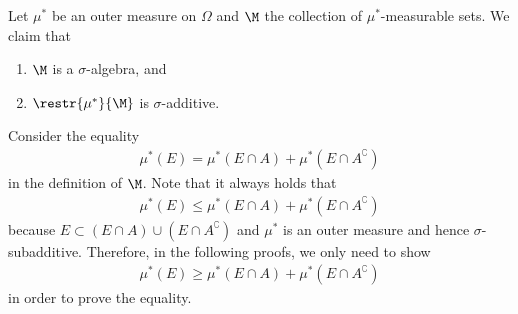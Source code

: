 \documentclass[thmcnt=section, 12pt]{elegantbook}
\begin{document}

\begin{theorem} \label{thm:4} %
    Let $ \mu^\ast $ be an outer measure on $ \Omega $ and $ \M $ the collection of $ \mu^\ast $-measurable sets. We claim that 
    \begin{enumerate}
        \item $ \M $ is a $ \sigma $-algebra, and
        \item $ \restr{\mu^\ast}{\M} $ is $ \sigma $-additive.
    \end{enumerate}
\end{theorem}

\par Consider the equality 
\begin{align*}
    \mu^\ast(E) = \mu^\ast(E \cap A) + \mu^\ast(E \cap A^\complement)
\end{align*}
in the definition of $ \M $. Note that it always holds that 
\begin{align*}
    \mu^\ast(E) \leq \mu^\ast(E \cap A) + \mu^\ast(E \cap A^\complement)
\end{align*}
because $ E \subset (E\cap A) \cup (E \cap A^\complement) $ and $ \mu^\ast $ is an outer measure and hence $ \sigma $-subadditive. Therefore, in the following proofs, we only need to show  
\begin{align*}
    \mu^\ast(E) \geq \mu^\ast(E \cap A) + \mu^\ast(E \cap A^\complement)
\end{align*}
in order to prove the equality.
\end{document}
